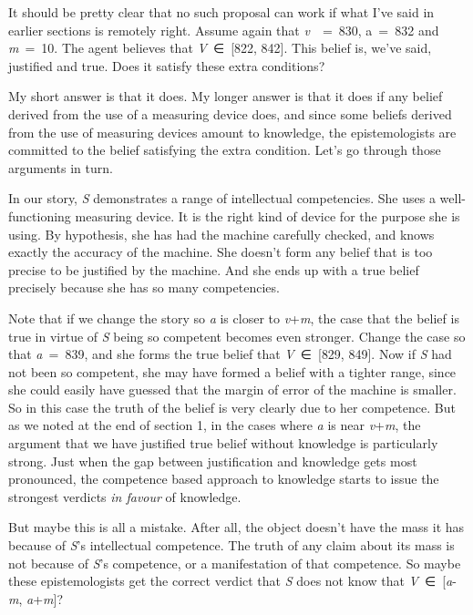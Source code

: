 \documentclass[
  11pt,
  letterpaper,
  DIV=11,
  numbers=noendperiod,
  twoside]{scrartcl}
\begin{document}
It should be pretty clear that no such proposal can work if what I've
said in earlier sections is remotely right. Assume again that
\emph{v}~~=~830, a~=~832 and \emph{m}~=~10. The agent believes that
\emph{V}~∈~{[}822, 842{]}. This belief is, we've said, justified and
true. Does it satisfy these extra conditions?

My short answer is that it does. My longer answer is that it does if any
belief derived from the use of a measuring device does, and since some
beliefs derived from the use of measuring devices amount to knowledge,
the epistemologists are committed to the belief satisfying the extra
condition. Let's go through those arguments in turn.

In our story, \emph{S} demonstrates a range of intellectual
competencies. She uses a well-functioning measuring device. It is the
right kind of device for the purpose she is using. By hypothesis, she
has had the machine carefully checked, and knows exactly the accuracy of
the machine. She doesn't form any belief that is too precise to be
justified by the machine. And she ends up with a true belief precisely
because she has so many competencies.

Note that if we change the story so \emph{a} is closer to
\emph{v}+\emph{m}, the case that the belief is true in virtue of
\emph{S} being so competent becomes even stronger. Change the case so
that \emph{a}~=~839, and she forms the true belief that
\emph{V}~∈~{[}829, 849{]}. Now if \emph{S} had not been so competent,
she may have formed a belief with a tighter range, since she could
easily have guessed that the margin of error of the machine is smaller.
So in this case the truth of the belief is very clearly due to her
competence. But as we noted at the end of section 1, in the cases where
\emph{a} is near \emph{v}+\emph{m}, the argument that we have justified
true belief without knowledge is particularly strong. Just when the gap
between justification and knowledge gets most pronounced, the competence
based approach to knowledge starts to issue the strongest verdicts
\emph{in favour} of knowledge.

But maybe this is all a mistake. After all, the object doesn't have the
mass it has because of \emph{S}'s intellectual competence. The truth of
any claim about its mass is not because of \emph{S}'s competence, or a
manifestation of that competence. So maybe these epistemologists get the
correct verdict that \emph{S} does not know that
\emph{V}~∈~{[}\emph{a}-\emph{m}, \emph{a}+\emph{m}{]}?
\end{document}
